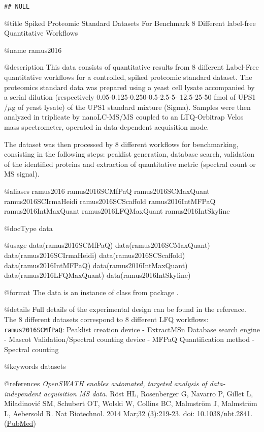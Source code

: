 \documentclass[
]{article}
\begin{document}
\begin{verbatim}
## NULL
\end{verbatim}

@title Spiked Proteomic Standard Datasets For Benchmark 8 Different
label-free Quantitative Workflows

@name ramus2016

@description This data consists of quantitative results from 8 different
Label-Free quantitative workflows for a controlled, spiked proteomic
standard dataset. The proteomics standard data was prepared using a
yeast cell lysate accompanied by a serial dilution (respectively
0.05-0.125-0.250-0.5-2.5-5- 12.5-25-50 fmol of UPS1 /\(\mu\)g of yeast
lysate) of the UPS1 standard mixture (Sigma). Samples were then analyzed
in triplicate by nanoLC-MS/MS coupled to an LTQ-Orbitrap Velos mass
spectrometer, operated in data-dependent acquisition mode.

The dataset was then processed by 8 different workflows for
benchmarking, consisting in the following steps: peaklist generation,
database search, validation of the identified proteins and extraction of
quantitative metric (spectral count or MS signal).

@aliases ramus2016 ramus2016SCMfPaQ ramus2016SCMaxQuant
ramus2016SCIrmaHeidi ramus2016SCScaffold ramus2016IntMFPaQ
ramus2016IntMaxQuant ramus2016LFQMaxQuant ramus2016IntSkyline

@docType data

@usage data(ramus2016SCMfPaQ) data(ramus2016SCMaxQuant)
data(ramus2016SCIrmaHeidi) data(ramus2016SCScaffold)
data(ramus2016IntMFPaQ) data(ramus2016IntMaxQuant)
data(ramus2016LFQMaxQuant) data(ramus2016IntSkyline)

@format The data is an instance of class  from package
.

@details Full details of the experimental design can be found in the
reference. The 8 different datasets correspond to 8 different LFQ
workflows: \texttt{ramus2016SCMfPaQ}: Peaklist creation device -
ExtractMSn Database search engine - Mascot Validation/Spectral counting
device - MFPaQ Quantification method - Spectral counting

@keywords datasets

@references
\emph{OpenSWATH enables automated, targeted analysis of data-independent
acquisition MS data.} Röst HL, Rosenberger G, Navarro P, Gillet L,
Miladinović SM, Schubert OT, Wolski W, Collins BC, Malmström J,
Malmström L, Aebersold R. Nat Biotechnol. 2014 Mar;32 (3):219-23. doi:
10.1038/nbt.2841.
(\href{https://www.ncbi.nlm.nih.gov/pubmed/23979570}{PubMed})
\end{document}
